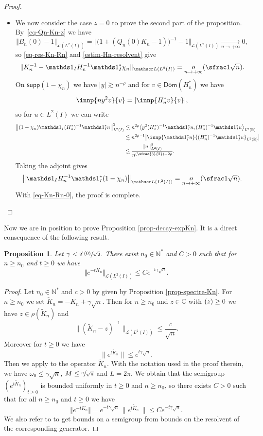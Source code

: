 \documentclass[10pt]{amsart}
\let\mathcal\mathscr
\newcommand{\Psfrac}[2]{(\sfrac{#1}{#2})}
\theoremstyle{plain}
\newtheorem{proposition}[theorem]{Proposition}
\theoremstyle{definition}
\newcommand {\limt}[2]{\xrightarrow[#1 \to #2]{}}
\newcommand{\abs}[1]{\vert #1\vert}
\newcommand{\babs}[1]{\bigl\vert #1\bigr\vert}
\newcommand{\nr}[1]{\Vert #1\Vert}
\newcommand{\bnr}[1]{\bigl\Vert #1\bigr\Vert}
\newcommand{\binnp}[2]{\bigl\langle #1 , #2 \bigr\rangle}
\newcommand{\inv}{^{-1}}
\newcommand{\littleo}[2]{\mathop{o}\limits_{#1 \to #2}}
\newcommand{\1}{\mathds 1}
\let\Re\relax
\DeclareMathOperator{\Re}{\mathsf{Re}\mkern2mu}
\let\Im\relax
\DeclareMathOperator{\Im}{\mathsf{Im}\mkern2mu}
\newcommand{\supp}{\mathsf{supp}}
\newcommand{\Dom}{\mathsf{Dom}}
\newcommand{\R}{\mathbb{R}}
\def\C{\mathbb{C}}
\newcommand{\N}{\mathbb{N}}
\let\g\gamma
\let\h\chi
\let\o\omega
\newcommand{\Lc}{{\mathcal L}}
\begin{document}
\begin{proof}
\begin{itemize}
\item
We now consider the case $z = 0$ to prove the second part of the proposition. By~\eqref{eq-Qn-Kn-z} we have
\[
\nr{B_n(0) - 1}_{\Lc(L^2(I))} = \bnr{ \bigl(1 + (Q_n(0) K_n-1) \bigr)\inv - 1}_{\Lc(L^2(I))} \limt n {+\infty} 0,
\]
so \eqref{eq-res-Kn-Rn} and \eqref{estim-Hn-resolvent} give
\begin{equation} \label{eq-Kn-Rn-0}
\nr{K_n\inv - \1_I H_n\inv \1_I^* \h_n}_{\Lc(L^2(I))} = \littleo n {+\infty}(\sfrac 1 {\sqrt n}).
\end{equation}
On $\supp(1-\chi_n)$ we have $\abs y \gtrsim n^{-\rho}$ and for $v \in \Dom(H_n^*)$ we have
\[
\innp{n y^2 v}{v} = \abs{\Im\innp{H_n^* v}{v}},
\]
so for $u \in L^2(I)$ we can write
\begin{align*}
\bnr{(1-\chi_n) \1_I (H_n^*)\inv \1_I^* u}^2_{L^2(I)}
& \lesssim n^{2\rho} \binnp{y^2 (H_n^*)\inv \1_I^*u}{(H_n^*)\inv \1_I^*u}_{L^2(\R)} \\
& \lesssim n^{2\rho - 1} \babs{\Im \innp{\1_I^* u}{(H_n^*)\inv \1_I^* u}_{L^2(\R)}} \\
& \lesssim \frac {\nr u^2_{L^2(I)}}{n^{\Psfrac 32 - 2\rho}}.
\end{align*}
Taking the adjoint gives
\[
\bnr{\1_I H_n\inv \1_I^* (1-\chi_n)}_{\Lc(L^2(I))} = \littleo n {+\infty}(\sfrac 1 {\sqrt n}).
\]
With \eqref{eq-Kn-Rn-0}, the proof is complete.\qedhere
\end{itemize}
\end{proof}

Now we are in position to prove Proposition \ref{prop-decay-expKn}. It is a direct consequence of the following result.

\begin{proposition} \label{prop-exp-Kn}
Let $\gamma < \sfrac {q'(0)}{\sqrt 2}$. There exist $n_0 \in \N^*$ and $C > 0$ such that for $n \geq n_0$ and $t \geq 0$ we have
\[
\nr{e^{-tK_n}}_{\Lc(L^2(I))} \leq C e^{-t\gamma \sqrt n}.
\]
\end{proposition}

\begin{proof}
Let $n_0 \in \N^*$ and $c > 0$ by given by Proposition \ref{prop-spectre-Kn}. For $n \geq n_0$ we set $\tilde K_n = -K_n + \g \sqrt n$. Then for $n \geq n_0$ and $z \in \C$ with $\Re(z) \geq 0$ we have $z \in \rho(\tilde K_n)$ and
\[
\big\| (\tilde K_n - z)\inv \big\|_{\Lc(L^2(I))} \leq \frac {c}{\sqrt n}.
\]
Moreover for $t \geq 0$ we have
\[
\bigl\|e^{t \tilde K_n} \bigr\| \leq e^{t\g \sqrt n}.
\]
Then we apply \cite[Th. V.1.11 p. 302]{engel} to the operator $\tilde K_n$. With the notation used in the proof therein, we have $\o_0 \leq \g \sqrt n$, $M\leq \sfrac c {\sqrt n}$ and $L= 2\pi$. We obtain that the semigroup $(e^{t\tilde K_n})_{t \geq 0}$ is bounded uniformly in $t \geq 0$ and $n \geq n_0$, so there exists $C > 0$ such that for all $n \geq n_0$ and $t \geq 0$ we have
\[
\nr{e^{-tK_n}} = e^{-t\g \sqrt n}\, \bigl \| e^{t\tilde K_n}\, \bigr \| \leq C e^{-t\g \sqrt n}.
\]
We also refer to \cite{HelfferSjo10} to get bounds on a semigroup from bounds on the resolvent of the corresponding generator.
\end{proof}
\end{document}
